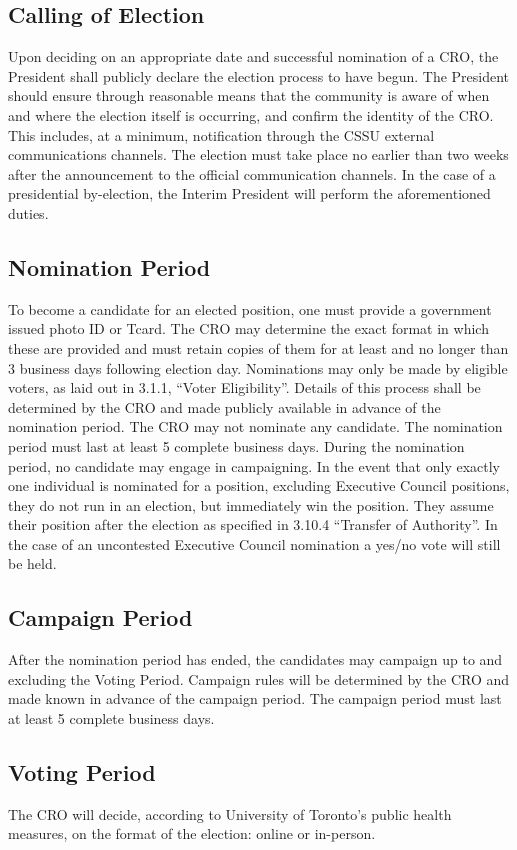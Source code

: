 \documentclass{article}
\begin{document}
\subsection{Calling of Election}  \label{sec:3.4}
Upon deciding on an appropriate date and successful nomination of a CRO, the President shall publicly declare the election process to have begun. The President should ensure through reasonable means that the community is aware of when and where the election itself is occurring, and confirm the identity of the CRO. This includes, at a minimum, notification through the CSSU external communications channels. The election must take place no earlier than two weeks after the announcement to the official communication channels. In the case of a presidential by-election, the Interim President will perform the aforementioned duties.
\subsection{Nomination Period} \label{sec:3.5}
To become a candidate for an elected position, one must provide a government issued photo ID
or Tcard. The CRO may determine the exact format in which these are provided and must retain
copies of them for at least and no longer than 3 business days following election day.
Nominations may only be made by eligible voters, as laid out in 3.1.1, “Voter Eligibility”. Details
of this process shall be determined by the CRO and made publicly available in advance of the
nomination period. The CRO may not nominate any candidate.
The nomination period must last at least 5 complete business days. During the nomination
period, no candidate may engage in campaigning.
In the event that only exactly one individual is nominated for a position, excluding Executive
Council positions, they do not run in an election, but immediately win the position. They assume their position after the election as specified in 3.10.4 “Transfer of Authority”. In
the case of an uncontested Executive Council nomination a yes/no vote will still be held.
\subsection{Campaign Period} \label{sec:3.6}
After the nomination period has ended, the candidates may campaign up to and excluding the
Voting Period.
Campaign rules will be determined by the CRO and made known in advance of the campaign
period. The campaign period must last at least 5 complete business days.
\subsection{Voting Period} \label{sec:3.7}
The CRO will decide, according to University of Toronto’s public health measures, on the format of the election: online or in-person.\\ 
\end{document}
